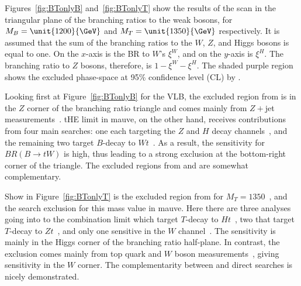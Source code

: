 Figures~\ref{fig:BTonlyB} and~\ref{fig:BTonlyT} show the results of the \contur scan in the triangular plane of the branching ratios to the weak bosons, for $M_B = \unit{1200}{\GeV}$ and $M_T = \unit{1350}{\GeV}$ respectively. It is assumed that the sum of the branching ratios to the $W$, $Z$, and Higgs bosons is equal to one. On the $x$-axis is the BR to $W$'s $\xi^W$, and on the $y$-axis is $\xi^H$. The branching ratio to $Z$ bosons, therefore, is $1-\xi^W-\xi^H$. The shaded purple region shows the excluded phase-space at 95\% confidence level (CL) by \ATLAS. 

Looking first at Figure~\ref{fig:BTonlyB} for the VLB, the excluded region from \contur is in the $Z$ corner of the branching ratio triangle and comes mainly from $Z+$jet measurements~\cite{Aad:2015auj,Aaboud:2017hox,Aaboud:2017hbk,Aaboud:2019jcc}. tHE \ATLAS limit in mauve, on the other hand, receives contributions from four main searches: one each targeting the $Z$ and $H$ decay channels~\cite{ZllSearch,HadSearch}, and the remaining two target $B$-decay to $Wt$~\cite{WtSearch,TriLepSearch}. As a result, the sensitivity for $BR(B\rightarrow tW)$ is high, thus leading to a strong exclusion at the bottom-right corner of the triangle. The excluded regions from \contur and \ATLAS are somewhat complementary. 

Show in Figure~\ref{fig:BTonlyT} is the excluded region from \contur for
$M_T = 1350$~\GeV, and the \ATLAS search exclusion for this mass value in mauve. Here there are three analyses going into to the \ATLAS combination limit which target $T$-decay to $Ht$~\cite{HbbSearch,TriLepSearch,HadSearch}, two that target $T$-decay to $Zt$~\cite{ZnunuSearch,ZllSearch}, and only one sensitive in the $W$ channel~\cite{WbSearch}. The \ATLAS sensitivity is mainly in the Higgs corner of the branching ratio half-plane. In contrast, the \contur exclusion comes mainly from top quark and $W$ boson measurements~\cite{Aaboud:2017fye,Aaboud:2018eqg,Sirunyan:2018wem,Khachatryan:2016mnb,Sirunyan:2018ptc}, giving sensitivity in the $W$ corner. The complementarity between \contur and direct searches is nicely demonstrated. 

